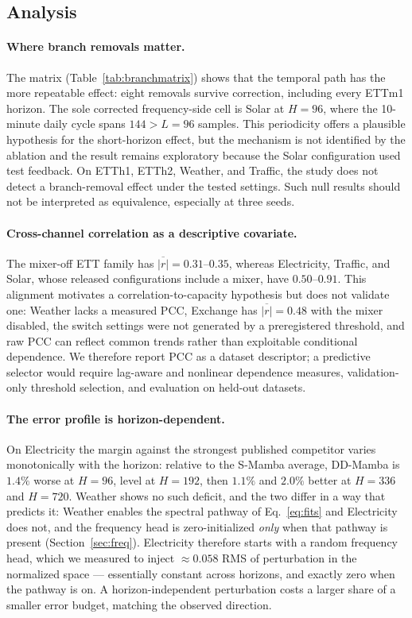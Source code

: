\documentclass[review,12pt]{elsarticle}
\newcommand{\model}{DD-Mamba}
\begin{document}
\subsection{Analysis}

\paragraph{Where branch removals matter.} The matrix
(Table~\ref{tab:branchmatrix}) shows that the temporal path has the more
repeatable effect: eight removals survive correction, including every ETTm1
horizon. The sole corrected frequency-side cell is Solar at $H{=}96$, where
the 10-minute daily cycle spans $144>L=96$ samples. This periodicity offers
a plausible hypothesis for the short-horizon effect, but the mechanism is
not identified by the ablation and the result remains exploratory because
the Solar configuration used test feedback. On ETTh1, ETTh2, Weather, and
Traffic, the study does not detect a branch-removal effect under the tested
settings. Such null results should not be interpreted as equivalence,
especially at three seeds.

\paragraph{Cross-channel correlation as a descriptive covariate.}
The mixer-off ETT family has $\overline{|r|}=0.31$--$0.35$, whereas
Electricity, Traffic, and Solar, whose released configurations include a
mixer, have $0.50$--$0.91$. This alignment motivates a
correlation-to-capacity hypothesis but does not validate one: Weather lacks a
measured PCC, Exchange has $\overline{|r|}=0.48$ with the mixer disabled, the
switch settings were not generated by a preregistered threshold, and raw PCC
can reflect common trends rather than exploitable conditional dependence. We
therefore report PCC as a dataset descriptor; a predictive selector would
require lag-aware and nonlinear dependence measures, validation-only
threshold selection, and evaluation on held-out datasets.

\paragraph{The error profile is horizon-dependent.} On Electricity the margin
against the strongest published competitor varies monotonically with the
horizon: relative to the S-Mamba average, \model{} is $1.4\%$ worse at
$H{=}96$, level at $H{=}192$, then $1.1\%$ and $2.0\%$ better at $H{=}336$ and
$H{=}720$. Weather shows no such deficit, and the two differ in a way that
predicts it: Weather enables the spectral pathway of Eq.~\eqref{eq:fits} and
Electricity does not, and the frequency head is zero-initialized \emph{only}
when that pathway is present (Section~\ref{sec:freq}). Electricity therefore
starts with a random frequency head, which we measured to inject
$\approx0.058$ RMS of perturbation in the normalized space --- essentially
constant across horizons, and exactly zero when the pathway is on. A
horizon-independent perturbation costs a larger share of a smaller error
budget, matching the observed direction.
\end{document}
